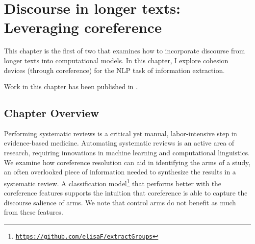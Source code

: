 \chapter{Discourse in longer texts: Leveraging coreference}
\label{ch:longertexts1}
This chapter is the first of two that examines how to incorporate discourse from longer texts into computational models. In this chapter, I explore cohesion devices (through coreference) for the NLP task of information extraction.

Work in this chapter has been published in .

\section{Chapter Overview}
Performing systematic reviews is a critical yet manual, labor-intensive step in evidence-based medicine. Automating systematic reviews is an active area of research, requiring innovations in machine learning and computational linguistics. We examine how coreference resolution can aid in identifying the arms of a study, an often overlooked piece of information needed to synthesize the results in a systematic review. A classification model\footnote{\href{http://github.com/elisaF/extractGroups}{\tt{https://github.com/elisaF/extractGroups}}} that performs better with the coreference features supports the intuition that coreference is able to capture the discourse salience of arms. We note that control arms do not benefit as much from these features. 


